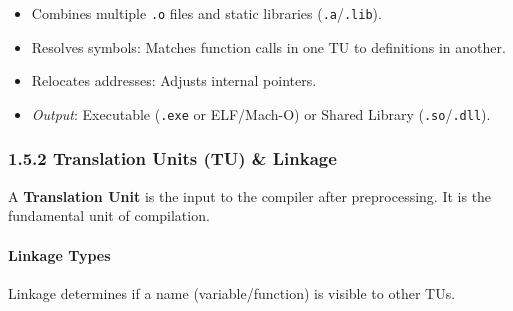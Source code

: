 \begin{enumerate}
  \begin{itemize}
  \tightlist
  \item
    Combines multiple \passthrough{\lstinline!.o!} files and static
    libraries
    (\passthrough{\lstinline!.a!}/\passthrough{\lstinline!.lib!}).
  \item
    Resolves symbols: Matches function calls in one TU to definitions in
    another.
  \item
    Relocates addresses: Adjusts internal pointers.
  \item
    \emph{Output}: Executable (\passthrough{\lstinline!.exe!} or
    ELF/Mach-O) or Shared Library
    (\passthrough{\lstinline!.so!}/\passthrough{\lstinline!.dll!}).
  \end{itemize}
\end{enumerate}

\hypertarget{translation-units-tu-linkage}{%
\subsubsection{1.5.2 Translation Units (TU) \&
Linkage}\label{translation-units-tu-linkage}}

A \textbf{Translation Unit} is the input to the compiler after
preprocessing. It is the fundamental unit of compilation.

\hypertarget{linkage-types}{%
\paragraph{Linkage Types}\label{linkage-types}}

Linkage determines if a name (variable/function) is visible to other
TUs.

